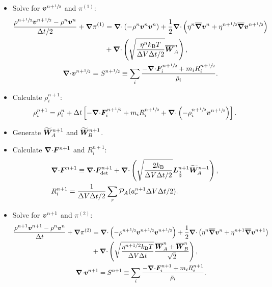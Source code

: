 \documentclass[
10pt
showpacs, showkeys,
amsmath,amssymb,
aps,
pre,
floatfix,
]{revtex4-1}
\newcommand{\divg}{{\V\nabla\cdot}}                       %
\newcommand{\paren}[1]{{(#1)}}                            %
\begin{document}
\begin{itemize}
\item Solve for $\boldsymbol{v}^{n+\sfrac{1}{2}}$ and $\pi^\paren{1}$:
\begin{gather}
\label{stokes_v_1st}
\begin{split}
\frac{\rho^{n+\myhalf}\V{v}^{n+\myhalf}-\rho^n\V{v}^n}{\D{t}/2} + \grad\pi^\paren{1}
&= \divg\left(-\rho^n\V{v}^n\V{v}^n\right) + \frac{1}{2}\divg\left( \eta^n \overline{\grad}\V{v}^n + \eta^{n+\myhalf} \overline{\grad}\V{v}^{n+\myhalf} \right) \\
&+ \divg\left( \sqrt{\frac{\eta^n k_\mathrm{B}T}{\D{V}\D{t}/2} } \overline{\V{W}}^n_A \right),
\end{split} \\
\label{stokes_p_1st}
\divg\V{v}^{n+\myhalf}=S^{n+\myhalf}\equiv \sum_i \frac{-\divg\V{F}^{n+\myhalf}_i + m_i R^{n+\myhalf}_i }{\bar{\rho}_i}.
\end{gather}

\item Calculate $\rho^{n+1}_i$:
\begin{equation}
\rho^{n+1}_i = \rho^n_i + \D{t} \left[ -\divg\V{F}^{n+\myhalf}_i + m_i R^{n+\myhalf}_i + \divg\left( -\rho^{n+\myhalf}_i \V{v}^{n+\myhalf} \right) \right].
\end{equation} 

\item Generate $\widetilde{\boldsymbol{W}}^{n+1}_A$ and $\widetilde{\boldsymbol{W}}^{n+1}_B$.

\item Calculate $\divg\V{F}^{n+1}$ and $R^{n+1}_i$:
\begin{align}
\label{fluxdiv_2nd}
& \divg\V{F}^{n+1} \equiv \divg\V{F}_\mathrm{det}^{n+1} + \divg\left( \sqrt{ \frac{2k_\mathrm{B}}{\D{V}\D{t}/2} } \V{L}^{n+1}_{\frac12} \widetilde{\V{W}}^{n+1}_A \right), \\
\label{chemrate_2nd}
& R^{n+1}_i = \frac{1}{\D{V}\D{t}/2}\sum_r \mathcal{P}_A(a^{n+1}_r\D{V}\D{t}/2).
\end{align}

\item Solve for $\boldsymbol{v}^{n+1}$ and $\pi^\paren{2}$:
\begin{gather}
\label{stokes_v_2nd}
\begin{split}
\frac{\rho^{n+1}\V{v}^{n+1}-\rho^n\V{v}^n}{\D{t}} + \grad\pi^\paren{2}
&= \divg\left(-\rho^{n+\myhalf}\V{v}^{n+\myhalf}\V{v}^{n+\myhalf}\right) + \frac{1}{2}\divg\left( \eta^n \overline{\grad}\V{v}^n + \eta^{n+1} \overline{\grad}\V{v}^{n+1} \right) \\
&+ \divg\left( \sqrt{\frac{\eta^{n+1/2} k_\mathrm{B}T}{\D{V}\D{t}} } \frac{\overline{\V{W}}^n_A + \overline{\V{W}}^n_B}{\sqrt{2}} \right),
\end{split} \\
\label{stokes_p_2nd}
\divg\V{v}^{n+1}=S^{n+1}\equiv \sum_i \frac{-\divg\V{F}^{n+1}_i + m_i R^{n+1}_i }{\bar{\rho}_i}.
\end{gather}

\end{itemize}
\end{document}
